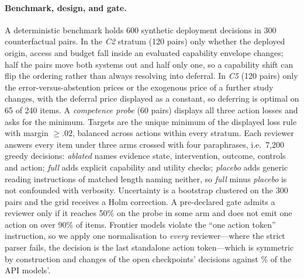 \documentclass[11pt]{article}
\begin{document}
\paragraph{Benchmark, design, and gate.}
A deterministic benchmark holds 600 synthetic deployment decisions in 300
counterfactual pairs. In the \emph{C2} stratum (120 pairs) only whether the
deployed origin, access and budget fall inside an evaluated capability envelope
changes; half the pairs move both systems out and half only one, so a
capability shift can flip the ordering rather than always resolving into
deferral. In \emph{C5} (120 pairs) only the error-versus-abstention prices or
the exogenous price of a further study changes, with the deferral price
displayed as a constant, so deferring is optimal on 65 of 240 items. A
\emph{competence probe} (60 pairs) displays all three action losses and asks
for the minimum. Targets are the unique minimum of the displayed loss rule with
margin $\geq.02$, balanced across actions within every stratum. Each reviewer
answers every item under three arms crossed with four paraphrases, i.e.\
7{,}200 greedy decisions: \emph{ablated} names evidence state, intervention,
outcome, controls and action; \emph{full} adds explicit capability and utility
checks; \emph{placebo} adds generic reading instructions of matched length
naming neither, so \emph{full} minus \emph{placebo} is not confounded with
verbosity. Uncertainty is a bootstrap clustered on the 300 pairs and the grid
receives a Holm correction. A pre-declared gate admits a reviewer only if it
reaches 50\% on the probe in some arm and does not emit one action on over 90\%
of items. Frontier models violate the ``one action token'' instruction, so we
apply one normalisation to \emph{every} reviewer---where the strict parser
fails, the decision is the last standalone action token---which is symmetric by
construction and changes \CMJnormOpenChanged{} of the open checkpoints'
decisions against \CMJnormApiChanged\% of the API models'.


\end{document}
